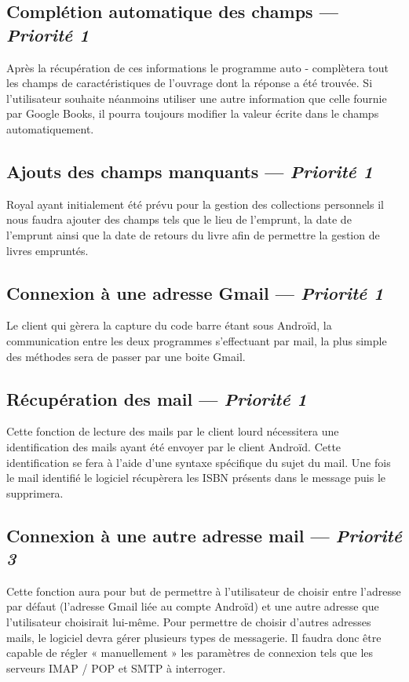 \subsection[Complétion automatique des champs]{Complétion automatique des champs — \emph{Priorité 1}}
Après la récupération de ces informations le programme auto - complètera tout les champs de caractéristiques de l'ouvrage dont la réponse a été trouvée.
Si l'utilisateur souhaite néanmoins utiliser une autre information que celle fournie par Google Books, il pourra toujours modifier la valeur écrite dans le champs automatiquement.

\subsection[Ajouts des champs manquants]{Ajouts des champs manquants — \emph{Priorité 1}}
Royal ayant initialement été prévu pour la gestion des collections personnels il nous faudra ajouter des champs tels que le lieu de l'emprunt, la date de l'emprunt ainsi que la date de retours du livre afin de permettre la gestion de livres empruntés. 

\subsection[Connexion à une adresse Gmail]{Connexion à une adresse Gmail — \emph{Priorité 1}} 
Le client qui gèrera la capture du code barre étant sous Androïd, la communication entre les deux programmes s'effectuant par mail, la plus simple des méthodes sera de passer par une boite Gmail.

\subsection[Récupération des mails]{Récupération des mail — \emph{Priorité 1}} 
Cette fonction de lecture des mails par le client lourd nécessitera une identification des mails ayant été envoyer par le client Androïd. 
Cette identification se fera à l'aide d'une syntaxe spécifique du sujet du mail. Une fois le mail identifié le logiciel récupèrera les ISBN présents dans le message puis le supprimera.  




\subsection[Connexion à une autre adresse mail]{Connexion à une autre adresse mail — \emph{Priorité 3}}
Cette fonction aura pour but de permettre à l'utilisateur de choisir entre l'adresse par défaut (l'adresse Gmail liée au compte Androïd) et une autre adresse que l'utilisateur choisirait lui-même. 
Pour permettre de choisir d'autres adresses mails, le logiciel devra gérer plusieurs types de messagerie.
Il faudra donc être capable de régler « manuellement » les paramètres de connexion tels que les serveurs IMAP / POP et SMTP à interroger.

